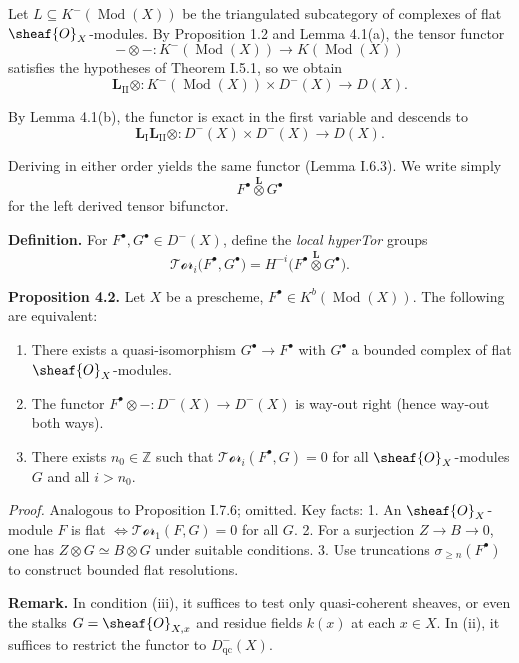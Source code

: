 Let $L\subseteq K^-(\operatorname{Mod}(X))$ be the triangulated subcategory of complexes of flat $\sheaf{O}_X$-modules.
By Proposition 1.2 and Lemma 4.1(a), the tensor functor
\[
-\otimes-\colon K^-(\operatorname{Mod}(X)) \to K(\operatorname{Mod}(X))
\]
satisfies the hypotheses of Theorem I.5.1, so we obtain
\setcounter{page}{95}
\[
\mathbf{L}_\mathrm{II}\otimes\colon K^-(\operatorname{Mod}(X)) \times D^-(X) \to D(X).
\]

By Lemma 4.1(b), the functor is exact in the first variable and descends to
\[
\mathbf{L}_\mathrm{I}\mathbf{L}_\mathrm{II}\otimes
\colon D^-(X)\times D^-(X)\to D(X).
\]

Deriving in either order yields the same functor (Lemma I.6.3).
We write simply
\[
F^\bullet\stackrel{\mathbf{L}}{\otimes} G^\bullet
\]
for the left derived tensor bifunctor.

\textbf{Definition.}
For $F^\bullet,G^\bullet\in D^-(X)$, define the \textit{local hyperTor} groups
\[
\mathcal{Tor}_i\big(F^\bullet,G^\bullet\big)
= H^{-i}\big(F^\bullet\stackrel{\mathbf{L}}{\otimes} G^\bullet\big).
\]

\textbf{Proposition 4.2.}
Let $X$ be a prescheme, $F^\bullet\in K^b(\operatorname{Mod}(X))$.
The following are equivalent:
\begin{enumerate}
\item[(i)] There exists a quasi-isomorphism $G^\bullet\to F^\bullet$ with $G^\bullet$ a bounded complex of flat $\sheaf{O}_X$-modules.
\item[(ii)] The functor $F^\bullet\otimes-\colon D^-(X)\to D^-(X)$ is way-out right (hence way-out both ways).
\setcounter{page}{96}
\item[(iii)] There exists $n_0\in\mathbb{Z}$ such that $\mathcal{Tor}_i(F^\bullet,G)=0$ for all $\sheaf{O}_X$-modules $G$ and all $i>n_0$.
\end{enumerate}

\textit{Proof.}
Analogous to Proposition I.7.6; omitted.
Key facts:
1. An $\sheaf{O}_X$-module $F$ is flat $\iff \mathcal{Tor}_1(F,G)=0$ for all $G$.
2. For a surjection $Z\to B\to 0$, one has $Z\otimes G\simeq B\otimes G$ under suitable conditions.
3. Use truncations $\sigma_{\ge n}(F^\bullet)$ to construct bounded flat resolutions.

\textbf{Remark.}
In condition (iii), it suffices to test only quasi-coherent sheaves, or even the stalks $G=\sheaf{O}_{X,x}$ and residue fields $k(x)$ at each $x\in X$.
In (ii), it suffices to restrict the functor to $D_\mathrm{qc}^-(X)$.

